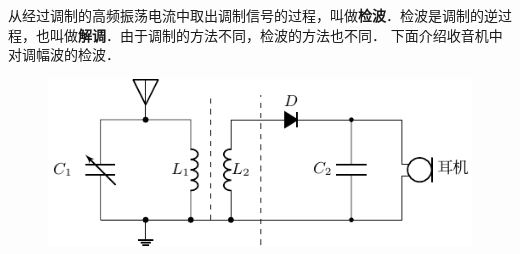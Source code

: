 从经过调制的高频振荡电流中取出调制信号的过程，叫做\textbf{检波}．检波是调制的逆过程，也叫做\textbf{解调}．由于调制的方法不同，检波的方法也不同．
下面介绍收音机中对调幅波的检波．
\begin{figure}[htbp]
    \centering
    \includegraphics{fig/C/4-18.pdf}
    \caption{}\label{fig_C_4-18}
\end{figure}

